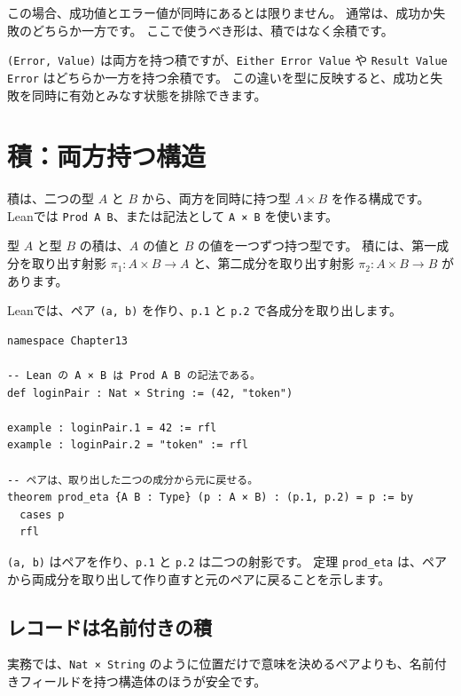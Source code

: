 この場合、成功値とエラー値が同時にあるとは限りません。
通常は、成功か失敗のどちらか一方です。
ここで使うべき形は、積ではなく余積です。

\texttt{(Error, Value)} は両方を持つ積ですが、\texttt{Either Error Value} や \texttt{Result Value Error} はどちらか一方を持つ余積です。
この違いを型に反映すると、成功と失敗を同時に有効とみなす状態を排除できます。

\section{積：両方持つ構造}
\label{sec:ch13-product}

積は、二つの型 \(A\) と \(B\) から、両方を同時に持つ型 \(A \times B\) を作る構成です。
Leanでは \texttt{Prod A B}、または記法として \texttt{A × B} を使います。

型 \(A\) と型 \(B\) の積は、\(A\) の値と \(B\) の値を一つずつ持つ型です。
積には、第一成分を取り出す射影 \(\pi_1 : A \times B \to A\) と、第二成分を取り出す射影 \(\pi_2 : A \times B \to B\) があります。

Leanでは、ペア \texttt{(a, b)} を作り、\texttt{p.1} と \texttt{p.2} で各成分を取り出します。

\begin{listing}[htbp]
\begin{verbatim}
namespace Chapter13

-- Lean の A × B は Prod A B の記法である。
def loginPair : Nat × String := (42, "token")

example : loginPair.1 = 42 := rfl
example : loginPair.2 = "token" := rfl

-- ペアは、取り出した二つの成分から元に戻せる。
theorem prod_eta {A B : Type} (p : A × B) : (p.1, p.2) = p := by
  cases p
  rfl
\end{verbatim}
\caption{\texttt{Prod} と \texttt{prod\_eta}}
\label{lst:ch13_prod_basic}
\end{listing}

\texttt{(a, b)} はペアを作り、\texttt{p.1} と \texttt{p.2} は二つの射影です。
定理 \texttt{prod\_eta} は、ペアから両成分を取り出して作り直すと元のペアに戻ることを示します。

\subsection{レコードは名前付きの積}

実務では、\texttt{Nat × String} のように位置だけで意味を決めるペアよりも、名前付きフィールドを持つ構造体のほうが安全です。

